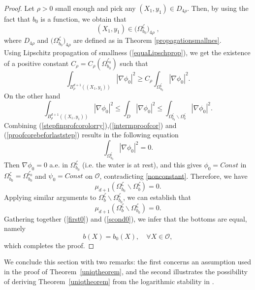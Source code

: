 \documentclass[11pt]{article}
\begin{document}
\begin{proof}
	Let $\rho>0$ small enough and pick any  $(X_1,y_1)\in D_{4\rho}$. Then, by using the fact that $b_0$ is a function, we obtain that
	$$(X_1,y_1)\in \big( \Omega_{b_0}^{\zeta}\big) _{4\rho}\;,$$
	where $D_{4\rho}$ and $\big(\Omega_{b_0}^{\zeta}\big)_{4\rho}$ are defined as in Theorem \ref{propagationsmallnes}.\\
	Using  Lipschitz propagation of smallness (\ref{equaLipschprop}), we get the existence of a positive constant $C_{\rho}=C_{\rho}\left(\Omega_{b_0}^{\zeta_0}\right)$ such that 
	\begin{equation}\label{intermproofcor}
		\displaystyle\int_{B_{\rho}^{d+1}((X_1,y_1))}|\nabla \phi_0|^2\geq C_{\rho} \displaystyle\int_{\Omega_{b_0}^{\zeta}} |\nabla \phi_0|^2.
	\end{equation}
	On the other hand
	\begin{equation}\label{stepfinprofcorolorry}
		\displaystyle\int_{B_{\rho}^{d+1}((X_1,y_1))}|\nabla \phi_0|^2\leq \displaystyle\int_{D}|\nabla \phi_0|^2\leq  \displaystyle\int_{\Omega_{b_0}^{\zeta}\backslash \Omega_{b}^{\zeta}}\left|\nabla\phi_0\right|^2.
	\end{equation}
	Combining (\ref{stepfinprofcorolorry}),(\ref{intermproofcor}) and (\ref{proofcorebeforlaststep}) results in the following equation
	$$\displaystyle\int_{\Omega_{b_0}^{\zeta}} |\nabla \phi_0|^2=0.$$
	Then $\nabla \phi_0=0$ a.e. in $\Omega_{b_0}^{\zeta}$ (i.e. the water is at rest), and this gives
	$\phi _0=Const$ in $\Omega_{b_0}^{\zeta} = \Omega_{b_0}^{\zeta _0}$ and $\psi _0=Const$ on $\mathcal O$, contradicting \eqref{nonconstant}. Therefore, we have
	\begin{equation}\label{first0}
		\mu_{d+1} \left(\Omega_{b_0}^{\zeta}\backslash \Omega_{b}^{\zeta}\right)=0. 
	\end{equation}
	Applying similar arguments to $\Omega_{b}^{\zeta}\backslash \Omega_{b_0}^{\zeta}$, we can establish that
	\begin{equation}\label{scond0}
		\mu_{d+1} \left(\Omega_{b}^{\zeta}\backslash \Omega_{b_0}^{\zeta}\right)=0.
	\end{equation}
	Gathering together (\ref{first0}) and (\ref{scond0}), we infer that the bottoms are equal, namely
	$$b(X)=b_0(X),\quad\forall X\in \mathcal O ,$$
	which completes the proof.
\end{proof}

We conclude this section with two remarks: the first concerns an assumption used in the proof of Theorem~\ref{uniqtheorem}, and the second illustrates the possibility of deriving Theorem~\ref{uniqtheorem} from the logarithmic stability in \cite{bourgeois2010about}.
\end{document}
